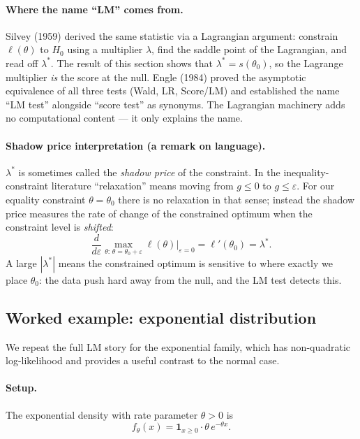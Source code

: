 \documentclass[a4paper,oneside,12pt]{extarticle}
\theoremstyle{plain}
\theoremstyle{definition}
\theoremstyle{remark}
\begin{document}
\paragraph{Where the name ``LM'' comes from.}
Silvey (1959) derived the same statistic via a Lagrangian argument:
constrain $\ell(\theta)$ to $H_0$ using a multiplier $\lambda$,
find the saddle point of the Lagrangian, and read off $\lambda^*$.
The result of this section shows that $\lambda^* = s(\theta_0)$,
so the Lagrange multiplier \emph{is} the score at the null.
Engle (1984) proved the asymptotic equivalence of all three tests
(Wald, LR, Score/LM) and established the name ``LM test'' alongside
``score test'' as synonyms.  The Lagrangian machinery adds no
computational content --- it only explains the name.

\paragraph{Shadow price interpretation (a remark on language).}
$\lambda^*$ is sometimes called the \emph{shadow price} of the
constraint.  In the inequality-constraint literature ``relaxation''
means moving from $g\le 0$ to $g\le\varepsilon$.  For our equality
constraint $\theta=\theta_0$ there is no relaxation in that sense;
instead the shadow price measures the rate of change of the
constrained optimum when the constraint level is \emph{shifted}:
\[
  \frac{d}{d\varepsilon}
  \max_{\theta:\,\theta=\theta_0+\varepsilon}\ell(\theta)
  \bigg|_{\varepsilon=0}
  = \ell'(\theta_0) = \lambda^*.
\]
A large $|\lambda^*|$ means the constrained optimum is sensitive
to where exactly we place $\theta_0$: the data push hard away from
the null, and the LM test detects this.

\subsection{Worked example: exponential distribution}
\label{subsec:lm_exp}

We repeat the full LM story for the exponential family, which has
non-quadratic log-likelihood and provides a useful contrast to the
normal case.

\paragraph{Setup.}
The exponential density with rate parameter $\theta > 0$ is
\[
  f_\theta(x) = \mathbf{1}_{x\ge 0}\cdot\theta\,e^{-\theta x}.
\]
\end{document}
